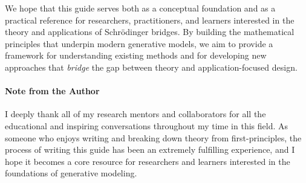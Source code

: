 \documentclass{article}
\begin{document}
We hope that this guide serves both as a conceptual foundation and as a practical reference for researchers, practitioners, and learners interested in the theory and applications of Schrödinger bridges. By building the mathematical principles that underpin modern generative models, we aim to provide a framework for understanding existing methods and for developing new approaches that \textit{bridge} the gap between theory and application-focused design.

\paragraph{Note from the Author} I deeply thank all of my research mentors and collaborators for all the educational and inspiring conversations throughout my time in this field. As someone who enjoys writing and breaking down theory from first-principles, the process of writing this guide has been an extremely fulfilling experience, and I hope it becomes a core resource for researchers and learners interested in the foundations of generative modeling.

\newpage
\printbibliography
\end{document}
